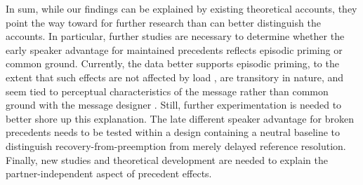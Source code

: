\documentclass[doc,fignum,apacite,floatsintext]{apa6}
\begin{document}
In sum, while our findings can be explained by existing theoretical accounts, they point the way toward for further research than can better distinguish the accounts.  In particular, further studies are necessary to determine whether the early speaker advantage for maintained precedents reflects episodic priming or common ground.  Currently, the data better supports episodic priming, to the extent that such effects are not affected by load \cite{kronmullerbarr07}, are transitory in nature, and seem tied to perceptual characteristics of the message rather than common ground with the message designer \cite{BarrJacksonPhillips2014}.  Still, further experimentation is needed to better shore up this explanation.  The late different speaker advantage for broken precedents needs to be tested within a design containing a neutral baseline to distinguish recovery-from-preemption from merely delayed reference resolution.  Finally, new studies and theoretical development are needed to explain the partner-independent aspect of precedent effects.

\end{document}

